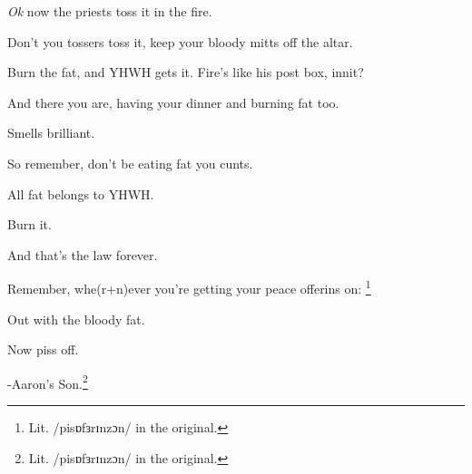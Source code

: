 {
}
{
}
{
	\textsl{Ok} now the priests toss it in the fire.

	Don't you tossers toss it, keep your bloody mitts off the altar.

	Burn the fat, and YHWH gets it. Fire's like his post box, innit?

	And there you are, having your dinner and burning fat too.

	Smells brilliant.

	So remember, don't be eating fat you cunts.

	All fat belongs to YHWH.
	
	Burn it.
}

{
}
{
}
{
	And that's the law forever.

	Remember, whe(r+n)ever you're getting your peace offerins on:%
	\footnote{Lit. /pisɒfɜrɪnzɔn/ in the original.}

	Out with the bloody fat.

	Now piss off.%

	-Aaron's Son.\footnote{Lit. /pisɒfɜrɪnzɔn/ in the original.}
}
